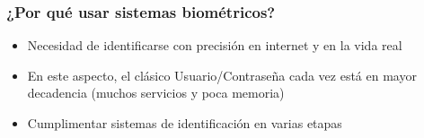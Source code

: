 \documentclass{beamer}
\begin{document}



\begin{frame}
\frametitle{¿Por qué usar sistemas biométricos?}
\begin{itemize}
    \item<1-> Necesidad de identificarse con precisión en internet y en la vida real 
    \item<2->  En este aspecto, el clásico Usuario/Contraseña cada vez está en mayor decadencia (muchos servicios y poca memoria) 
    \item<3-> Cumplimentar sistemas de identificación en varias etapas
\end{itemize}
\end{frame}

\end{document}
